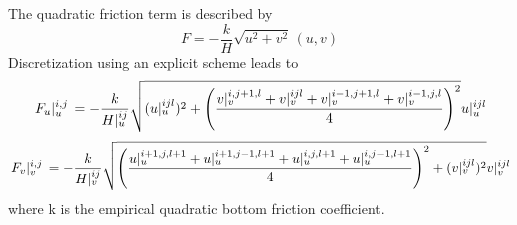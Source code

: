 \documentclass[a4paper]{article}
\begin{document}
The quadratic friction term is described by
\begin{equation}
  F = -\frac kH \sqrt{u^2+v^2}\,(u,v)
\end{equation}
Discretization using an explicit scheme leads to
\begin{equation}
  \,{F_u}\vert_{u}^{{i},{j}}\, = -\frac k{H\vert^{ij}_u} \sqrt{(u\vert^{ijl}_u)^2+\left(\frac{v\vert^{i,j+1,l}_v+v\vert^{ijl}_v+v\vert^{i-1,j+1,l}_v+v\vert^{i-1,j,l}_v}4\right)^2}u\vert^{ijl}_u
\end{equation}
\begin{equation}
  \,{F_v}\vert_{v}^{{i},{j}}\, = -\frac k{H\vert^{ij}_v} \sqrt{\left(\frac{u\vert^{i+1,j,l+1}_u+u\vert^{i+1,j-1,l+1}_u+u\vert^{i,j,l+1}_u+u\vert^{i,j-1,l+1}_u}4\right)^2+(v\vert^{ijl}_v)^2}v\vert^{ijl}_v
\end{equation}
where k is the empirical quadratic bottom friction coefficient.
\end{document}
